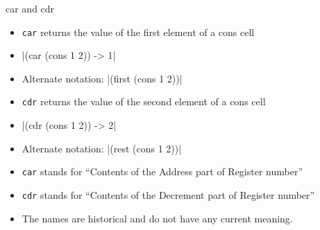 \documentclass{beamer}
\begin{document}
\begin{frame}{car and cdr}
  \begin{itemize}
  \item \texttt{car} returns the value of the first element of a cons cell
  \item \cl|(car (cons 1 2)) -> 1|
  \item Alternate notation: \cl|(first (cons 1 2))|
  \item \texttt{cdr} returns the value of the second element of a cons cell
  \item \cl|(cdr (cons 1 2)) -> 2|
  \item Alternate notation: \cl|(rest (cons 1 2))|
  \item \texttt{car} stands for ``Contents of the Address part of Register number''
  \item \texttt{cdr} stands for ``Contents of the Decrement part of Register number''
  \item The names are historical and do not have any current meaning.
  \end{itemize}
\end{frame}
\end{document}
